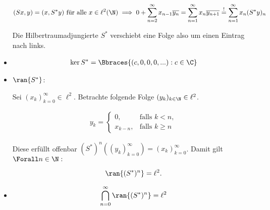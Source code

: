 \begin{solution}
\begin{itemize}
  \begin{align*}
    (Sx, y)
    =
    (x, S^\ast y)
    \text{~für alle~}
    x \in \ell^2(\N)
    \implies
    0 + \sum_{n=2}^\infty x_{n-1} \overline{y_n}
    =
    \sum_{n=1}^\infty x_n \overline{y_{n+1}}
    \stackrel{!}{=}
    \sum_{n=1}^\infty x_n (S^\ast y)_n
  \end{align*}

  Die Hilbertraumadjungierte $S^\ast$ verschiebt eine Folge also um einen Eintrag nach links.

  \item
  \begin{align*}
    \ker{S^\ast}
    =
    \Bbraces
    {
      (c, 0, 0, 0, ...):
      c \in \C
    }
  \end{align*}


  \item
  $\ran{S^\ast}$:

  Sei $(x_k)_{k=0}^\infty \in \ell^2$.
  Betrachte folgende Folge $(y_k)_{k \in \N} \in \ell^2$.

  \begin{align*}
  y_k =
  \begin{cases}
    0,       & \text{falls~} k < n, \\
    x_{k-n}, & \text{falls~} k \geq n
  \end{cases}
  \end{align*}

  Diese erfüllt offenbar $(S^\ast)^n ((y_k)_{k=0}^\infty) = (x_k)_{k=0}^\infty$.
  Damit gilt $\Forall n \in \N:$

  \begin{align*}
    \ran{(S^\ast)^n}
    =
    \ell^2.
  \end{align*}

  \item
  \begin{align*}
    \bigcap_{n=0}^\infty
    \ran{(S^\ast)^n}
    =
    \ell^2
  \end{align*}

\end{itemize}

\end{solution}
